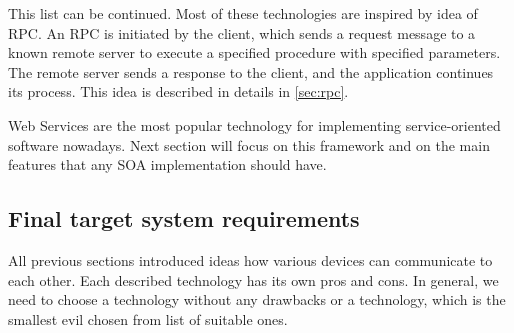 This list can be continued. Most of these technologies are inspired by idea
of \gls{RPC}. An \gls{RPC} is initiated by the client, which sends a request
message to a known remote server to execute a specified procedure with specified
parameters. The remote server sends a response to the client, and the application continues its process.
This idea is described in details in \autoref{sec:rpc}.



Web Services are the most popular technology for implementing
service-oriented software nowadays. Next section will focus on this framework
and on the main features that any \gls{SOA} implementation should have.














 




%




\subsection{Final target system requirements}

All previous sections introduced ideas how various devices can communicate to
each other. Each described technology has its own pros and cons. In general, we
need to choose a technology without any drawbacks or a technology, which is the
smallest evil chosen from list of suitable ones.


